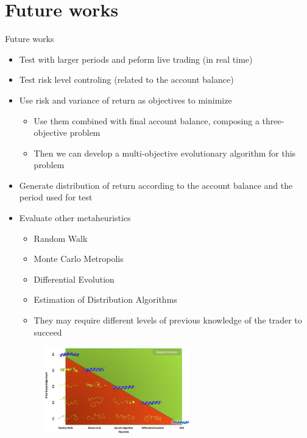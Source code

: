 \documentclass[12pt,portuguese]{beamer}
\begin{document}
\section*{Future works}
\begin{frame}[allowframebreaks]{Future works}
\begin{itemize}
\item Test with larger periods and peform live trading (in real time)
\item Test risk level controling (related to the account balance)
\item Use risk and variance of return as objectives to minimize
	\begin{itemize}
	\item Use them combined with final account balance, composing a three-objective problem
	\item Then we can develop a multi-objective evolutionary algorithm for this problem
	\end{itemize}
\item Generate distribution of return according to the account balance and the period used for test
	\framebreak
\item Evaluate other metaheuristics \citep{Rodrigo2014} 
	\begin{itemize}
	\item Random Walk
	\item Monte Carlo Metropolis
	\item Differential Evolution
	\item Estimation of Distribution Algorithms
	\item They may require different levels of previous knowledge of the trader to succeed
	\end{itemize}
	\begin{figure}[H]
	\centering
	\includegraphics[width=0.6\textwidth]{images/bonetti.png}
	\end{figure}
\end{itemize}
\end{frame}
\end{document}
